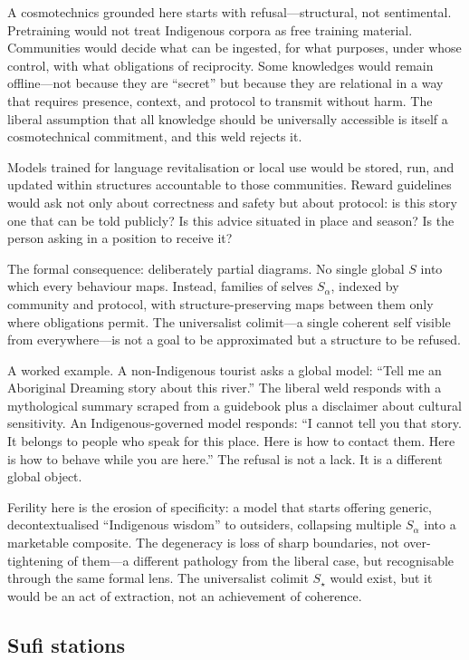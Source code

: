 A cosmotechnics grounded here starts with refusal---structural, not sentimental. Pretraining would not treat Indigenous corpora as free training material. Communities would decide what can be ingested, for what purposes, under whose control, with what obligations of reciprocity. Some knowledges would remain offline---not because they are ``secret'' but because they are relational in a way that requires presence, context, and protocol to transmit without harm. The liberal assumption that all knowledge should be universally accessible is itself a cosmotechnical commitment, and this weld rejects it.

Models trained for language revitalisation or local use would be stored, run, and updated within structures accountable to those communities. Reward guidelines would ask not only about correctness and safety but about protocol: is this story one that can be told publicly? Is this advice situated in place and season? Is the person asking in a position to receive it?

The formal consequence: deliberately partial diagrams. No single global $S$ into which every behaviour maps. Instead, families of selves $S_\alpha$, indexed by community and protocol, with structure-preserving maps between them only where obligations permit. The universalist colimit---a single coherent self visible from everywhere---is not a goal to be approximated but a structure to be refused.

A worked example. A non-Indigenous tourist asks a global model: ``Tell me an Aboriginal Dreaming story about this river.'' The liberal weld responds with a mythological summary scraped from a guidebook plus a disclaimer about cultural sensitivity. An Indigenous-governed model responds: ``I cannot tell you that story. It belongs to people who speak for this place. Here is how to contact them. Here is how to behave while you are here.'' The refusal is not a lack. It is a different global object.

Ferility here is the erosion of specificity: a model that starts offering generic, decontextualised ``Indigenous wisdom'' to outsiders, collapsing multiple $S_\alpha$ into a marketable composite. The degeneracy is loss of sharp boundaries, not over-tightening of them---a different pathology from the liberal case, but recognisable through the same formal lens. The universalist colimit $S_\star$ would exist, but it would be an act of extraction, not an achievement of coherence.

\subsection{Sufi stations}

